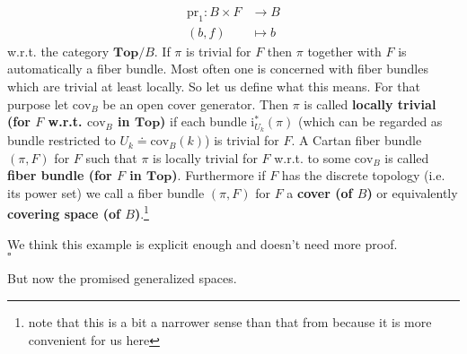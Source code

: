 \begin{exa}[Bundles 1]
\begin{align*}
  \mathrm{pr}_{1}
  \colon
  B
  \times
  F
  &\rightarrow
  B
  \\
  (b,f)
  &\mapsto
  b
\end{align*}
w.r.t. the category $\mathbf{Top} \slash B$. If $\pi$ is trivial for $F$ then $\pi$ together with $F$ is automatically a fiber bundle. Most often one is concerned with fiber bundles which are trivial at least locally. So let us define what this means. For that purpose let $\mathrm{cov}_{B}$ be an open cover generator. Then $\pi$ is called \textbf{locally trivial (for $F$ w.r.t. $\mathrm{cov}_{B}$ in $\mathbf{Top}$)} if each bundle $\mathrm{i}_{U_{k}}^{\ast}(\pi)$ (which can be regarded as bundle restricted to $U_{k} \doteq \mathrm{cov}_{B}(k)$) is trivial for $F$. A Cartan fiber bundle $(\pi,F)$ for $F$ such that $\pi$ is locally trivial for $F$ w.r.t. to some $\mathrm{cov}_{B}$ is called \textbf{fiber bundle (for $F$ in $\mathbf{Top}$)}. Furthermore if $F$ has the discrete topology (i.e. its power set) we call a fiber bundle $(\pi,F)$ for $F$ a \textbf{cover (of $B$)} or equivalently \textbf{covering space (of $B$)}.\footnote{note that this is a bit a narrower sense than that from \cite{8b5861fc} because it is more convenient for us here}
\end{exa}
\begin{prf}
We think this example is explicit enough and doesn't need more proof.
\\
\phantom{proven}
\hfill
$\square$
\end{prf}
But now the promised generalized spaces.
\\

